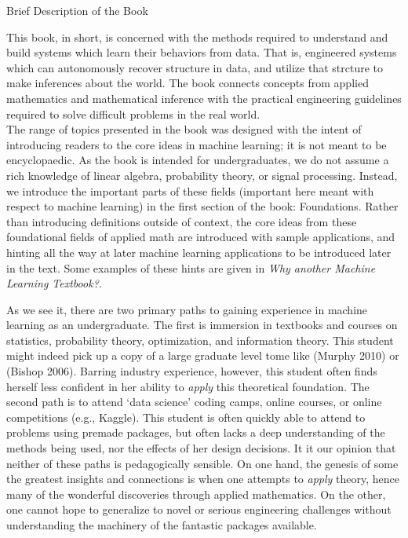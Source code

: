 \documentclass[10pt]{article}
\newenvironment{changemargin}[2]{%
\begin{list}{}{%
\setlength{\topsep}{0pt}%
\setlength{\leftmargin}{#1}%
\setlength{\rightmargin}{#2}%
\setlength{\listparindent}{\parindent}%
\setlength{\itemindent}{\parindent}%
\setlength{\parsep}{\parskip}%
}%
\item[]}{\end{list}}
\renewcommand{\it}{\textit}
\begin{document}
\begin{changemargin}{+-1cm}{-3cm}
\vspace{1cm}
\noindent
\large{Brief Description of the Book}\\
\small

This book, in short, is concerned with the methods required to understand and build systems which learn their behaviors from data. That is, engineered systems which can autonomously recover structure in data, and utilize that strcture to make inferences about the world. The book connects concepts from applied mathematics and mathematical inference with the practical engineering guidelines required to solve difficult problems in the real world. \\

The range of topics presented in the book was designed with the intent of introducing readers to the core ideas in machine learning; it is not meant to be encyclopaedic. As the book is intended for undergraduates, we do not assume a rich knowledge of linear algebra, probability theory, or signal processing. Instead, we introduce the important parts of these fields (important here meant with respect to machine learning) in the first section of the book: Foundations. Rather than introducing definitions outside of context, the core ideas from these foundational fields of applied math are introduced with sample applications, and hinting all the way at later machine learning applications to be introduced later in the text. Some examples of these hints are given in \it{Why another Machine Learning Textbook?}.

As we see it, there are two primary paths to gaining experience in machine learning as an undergraduate. The first is immersion in textbooks and courses on statistics, probability theory, optimization, and information theory. This student might indeed pick up a copy of a large graduate level tome like (Murphy 2010) or (Bishop 2006). Barring industry experience, however, this student often finds herself less confident in her ability to \it{apply} this theoretical foundation. The second path is to attend `data science' coding camps, online courses, or online competitions (e.g., Kaggle). This student is often quickly able to attend to problems using premade packages, but often lacks a deep understanding of the methods being used, nor the effects of her design decisions. It it our opinion that neither of these paths is pedagogically sensible. On one hand, the genesis of some the greatest insights and connections is when one attempts to \it{apply} theory, hence many of the wonderful discoveries through applied mathematics. On the other, one cannot hope to generalize to novel or serious engineering challenges without understanding the machinery of the fantastic packages available. \\


\end{changemargin}
\end{document}
